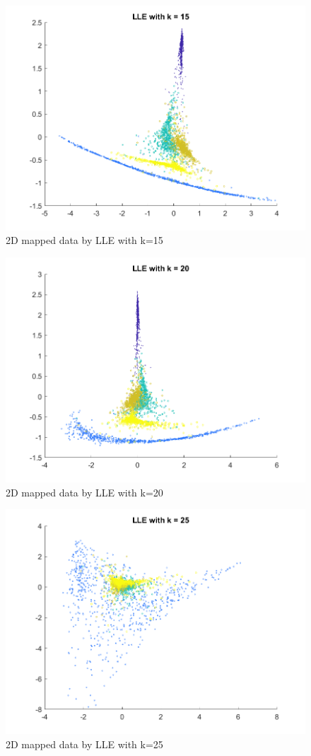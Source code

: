 \documentclass{article}
\begin{document}
{    \begin{figure}[H]
        \centering
        \includegraphics[width = 0.8\linewidth]{Q2/LLE_15.png}
        \caption{2D mapped data by LLE with k=15}
    \end{figure}

    \begin{figure}[H]
        \centering
        \includegraphics[width = 0.8\linewidth]{Q2/LLE_20.png}
        \caption{2D mapped data by LLE with k=20}
    \end{figure}

    \begin{figure}[H]
        \centering
        \includegraphics[width = 0.8\linewidth]{Q2/LLE_25.png}
        \caption{2D mapped data by LLE with k=25}
    \end{figure}

}
\end{document}
